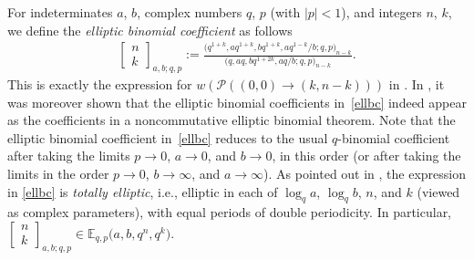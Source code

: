 \documentclass[pdftex]{sigma}
\numberwithin{equation}{section}
\theoremstyle{definition}
\newcommand{\E}{\mathbb E}
\begin{document}
For indeterminates $a$, $b$, complex numbers $q$, $p$
(with $|p|<1$), and integers $n$, $k$, we
define the {\em elliptic binomial coefficient} as follows
\begin{gather}\label{ellbc}
\begin{bmatrix}n\\k\end{bmatrix}_{a,b;q,p}:=
\frac{\bigl(q^{1+k},aq^{1+k},bq^{1+k},aq^{1-k}/b;q,p\bigr)_{n-k}}
{\bigl(q,aq,bq^{1+2k},aq/b;q,p\bigr)_{n-k}}.
\end{gather}
This is exactly the expression for $w(\mathcal P((0,0)\to(k,n-k)))$
in \cite[Theorem~2.1]{S}. In \cite{S1}, it was moreover shown that the
elliptic binomial coefficients in~\eqref{ellbc} indeed appear as the
coefficients in a noncommutative elliptic binomial theorem.
Note that the elliptic binomial coefficient
in~\eqref{ellbc} reduces to the usual $q$-binomial coefficient
after taking the limits $p\to 0$, $a\to 0$, and $b\to 0$,
in this order (or after taking the limits in the order $p\to 0$,
$b\to\infty$, and $a\to\infty$).
As pointed out in \cite{S}, the expression in
\eqref{ellbc} is {\em totally elliptic}, i.e.,
elliptic in each of $\log_qa$, $\log_qb$, $n$, and $k$
(viewed as complex parameters), with equal periods of double periodicity.
In particular,
$\left[\begin{smallmatrix}n\\k\end{smallmatrix}\right]_{a,b;q,p}
\in\E_{q,p}\bigl(a,b,q^n,q^k\bigr)$.
\end{document}
